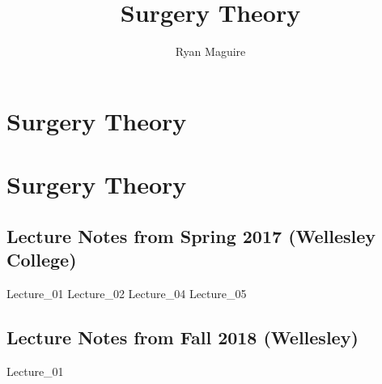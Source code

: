 \documentclass[crop=false,class=book,oneside]{standalone}
\begin{document}
    \ifx\ifmathcourses\undefined
        \newif\ifsub
        \title{Surgery Theory}
        \author{Ryan Maguire}
        \date{\vspace{-5ex}}
        \maketitle
        \tableofcontents
        \listoffigures
        \clearpage
        \chapter*{Surgery Theory}
        \setcounter{chapter}{1}
    \else
        \chapter{Surgery Theory}
    \fi
    \section{Lecture Notes from Spring 2017 (Wellesley College)}
        {Lecture_01}
        {Lecture_02}
        {Lecture_04}
        {Lecture_05}
    \section{Lecture Notes from Fall 2018 (Wellesley)}
        {Lecture_01}
\end{document}
